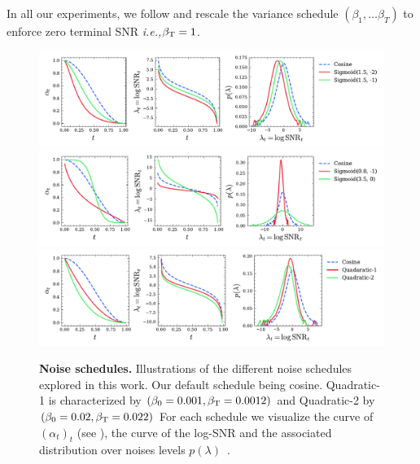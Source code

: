 \documentclass[twoside,11pt]{fairmeta}
\newcommand{\ie}{\textit{i.e.,}\xspace}
\def\rT{{\textnormal{T}}}
\begin{document}
In all our experiments, we follow \citet{lin2024common} and rescale the variance schedule $(\beta_1, \ldots \beta_T)$ to enforce zero terminal SNR \ie $\beta_\rT=1$.

\begin{figure}[!t]
    \centering
    \includegraphics[width=.85\linewidth]{lineplots/sigmoid_snrs.pdf}\\
    \includegraphics[width=.85\linewidth]{lineplots/outlier_sigmoid_snrs.pdf}\\
    \includegraphics[width=.85\linewidth]{figures/lineplots/scaled_linear_snrs.pdf}
    \caption{\textbf{Noise schedules.} Illustrations of the different noise schedules explored in this work. Our default schedule being cosine. Quadratic-1 is characterized by $(\beta_0=0.001, \beta_\rT=0.0012)$ and Quadratic-2 by $(\beta_0=0.02, \beta_\rT=0.022)$ For each schedule we visualize the curve of $(\alpha_t)_t$ (see ), the curve of the log-SNR and the associated distribution over noises levels $p(\lambda)$~\citep{kingma2024understanding}.}
    \label{fig:noise_schedules}
\end{figure}
\end{document}
